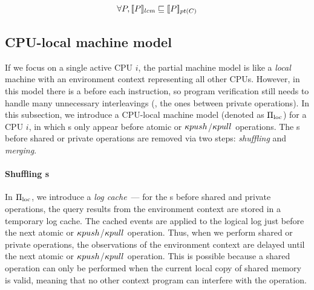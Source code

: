 \begin{lemma}
{\small \[\vspace{-10pt}\forall P, \sem{lcm}{P}\machrel \sem{pt(C)}{P}\vspace{-10pt}\]}
\end{lemma}

\subsection{CPU-local machine model}
\label{subsec:spec:seq}
If we focus on a single active CPU $i$,
the partial machine model is like a \emph{local} machine
with an environment context representing all other CPUs. However,
in this model there is a {\intptext} before each instruction,
so program verification still needs to handle many unnecessary 
interleavings (\eg, the ones between private operations).
In this subsection, we introduce a CPU-local
machine model (denoted as $\Pi_{\text{loc}}$) for a CPU $i$, in which {\intptext}s
only appear before atomic or $\kappa{push}$/$\kappa{pull}$ operations.
The {\intptext}s before shared or private operations
are removed via two steps: \emph{shuffling} and \emph{merging}.

\paragraph{Shuffling {\intptext}s}
In $\Pi_{\text{loc}}$, we introduce a \emph{log cache}~--- for
the {\intptext}s before shared and private operations,
the query results from the environment context
are stored in a temporary log cache.
The cached events are applied to the logical log
just before the next atomic or $\kappa{push}$/$\kappa{pull}$ operation.
Thus, when we perform shared or private operations,
the observations of the environment context are delayed
until the next atomic or $\kappa{push}$/$\kappa{pull}$ operation.
This is possible because a shared operation can only be performed
when the current local copy of shared memory is valid, meaning that 
no other context program can interfere with the operation.


